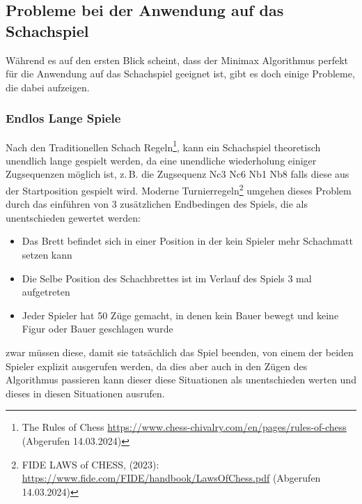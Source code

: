 \documentclass[12pt, a4paper, oneside, openright]{article}
\newcommand \zB{z.\,B.\xspace }
\begin{document}
\subsection{Probleme bei der Anwendung auf das Schachspiel}\label{subsec:probleme-bei-der-anwendung-auf-das-schachspiel}
Während es auf den ersten Blick scheint, dass der Minimax Algorithmus perfekt für die Anwendung auf das Schachspiel geeignet ist, gibt es doch einige Probleme, die dabei aufzeigen.

\subsubsection{Endlos Lange Spiele}
Nach den Traditionellen Schach Regeln\footnote{The Rules of Chess \url{https://www.chess-chivalry.com/en/pages/rules-of-chess} (Abgerufen 14.03.2024)}, kann ein Schachspiel theoretisch unendlich lange gespielt werden, da eine unendliche wiederholung einiger Zugsequenzen möglich ist, \zB die Zugsequenz {\selectfont Nc3 Nc6 Nb1 Nb8} falls diese aus der Startposition gespielt wird.
Moderne Turnierregeln\footnote{FIDE LAWS of CHESS, (2023): \url{https://www.fide.com/FIDE/handbook/LawsOfChess.pdf} (Abgerufen 14.03.2024)} umgehen dieses Problem durch das einführen von 3 zusätzlichen Endbedingen des Spiels, die als unentschieden gewertet werden:
\begin{itemize}
    \item Das Brett befindet sich in einer Position in der kein Spieler mehr Schachmatt setzen kann
    \item Die Selbe Position des Schachbrettes ist im Verlauf des Spiels 3 mal aufgetreten
    \item Jeder Spieler hat 50 Züge gemacht, in denen kein Bauer bewegt und keine Figur oder Bauer geschlagen wurde
\end{itemize}
zwar müssen diese, damit sie tatsächlich das Spiel beenden, von einem der beiden Spieler explizit ausgerufen werden, da dies aber auch in den Zügen des Algorithmus passieren kann dieser diese Situationen als unentschieden werten und dieses in diesen Situationen ausrufen.
\end{document}
